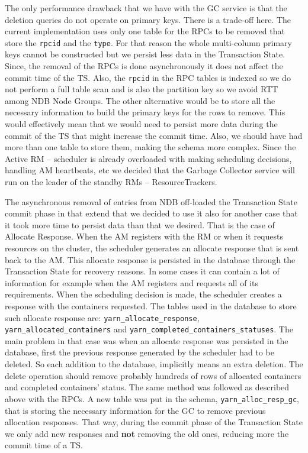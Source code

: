 The only performance drawback that we have with the GC service is that
the deletion queries do not operate on primary keys. There is a
trade-off here. The current implementation uses only one table for the
RPCs to be removed that store the \texttt{rpcid} and the
\texttt{type}. For that reason the whole multi-column primary keys
cannot be constructed but
we persist less data in the Transaction State. Since, the removal of
the RPCs is done asynchronously it does not affect the commit time
of the TS. Also, the \texttt{rpcid} in the RPC tables is indexed so we
do not perform a full table scan and is also the partition key so we avoid RTT
among NDB Node Groups. The other alternative would be to
store all the necessary information to build the primary keys for the
rows to remove. This would effectively mean that we would need to persist more
data during the commit of the TS that might increase the commit
time. Also, we should have had more than one table to store them,
making the schema more complex. Since the Active RM -- scheduler is
already overloaded with making scheduling decisions, handling AM
heartbeats, etc we decided that the Garbage Collector service will run on
the leader of the standby RMs -- ResourceTrackers.

The asynchronous removal of entries from NDB off-loaded the Transaction
State commit phase in that extend that we decided to use it also for
another case that it took more time to persist data than that we
desired. That is the case of Allocate Response. When the AM registers
with the RM or when it requests resources on the cluster, the
scheduler generates an allocate response that is sent back to the
AM. This allocate response is persisted in the database through the
Transaction State for recovery reasons. In some cases it can contain a
lot of information for example when the AM registers and requests all
of its requirements. When the scheduling decision is made, the scheduler creates a response with the
containers requested. The tables used in the database to store such
allocate response are: \texttt{yarn\_allocate\_response},
\texttt{yarn\_allocated\_containers} and
\texttt{yarn\_completed\_containers\_statuses}. The main problem in
that case was when an allocate response was persisted in the database, first
the previous response generated by the scheduler had to be deleted.
So each addition to the database, implicitly means an extra
deletion. The delete operation should remove probably hundreds of
rows of allocated containers and completed containers' status. The
same method was followed as described above with the RPCs. A new table
was put in the schema, \texttt{yarn\_alloc\_resp\_gc}, that is
storing the necessary information for the GC to remove previous
allocation responses. That way, during the commit phase of the
Transaction State we only add new responses and \textbf{not} removing
the old ones, reducing more the commit time of a TS.

